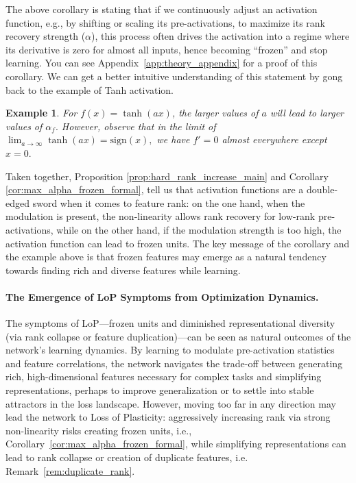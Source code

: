 \documentclass{article}
\newcommand{\GIU}[1]{\todo[color=purple!30,size=\tiny]{GIU: #1}}
\newtheorem{example}{Example}[section] %
\numberwithin{figure}{section}
\begin{document}
The above corollary is stating that if we continuously adjust an activation function, e.g., by shifting or scaling its pre-activations, to maximize its rank recovery strength ($\alpha$), this process often drives the activation into a regime where its derivative is zero for almost all inputs, hence becoming ``frozen'' and stop learning. You can see Appendix~\ref{app:theory_appendix} for a proof of this corollary. We can get a better intuitive understanding of this statement by gong back to the example of Tanh activation.

\begin{example}
For $f(x) = \tanh(ax)$, the larger values of $a$ will lead to larger values of $\alpha_f.$ However, observe that in the limit of $\lim_{a \to \infty} \tanh(a x) = \text{sign}(x),$ we have $f'=0$ almost everywhere except $x=0.$ 
\end{example}

Taken together, Proposition \ref{prop:hard_rank_increase_main} and Corollary \ref{cor:max_alpha_frozen_formal}, tell us that activation functions are a double-edged sword when it comes to feature rank: on the one hand, when the modulation is present, the non-linearity allows rank recovery for low-rank pre-activations, while on the other hand, if the modulation strength  is too high, the activation function can lead to frozen units.   
The key message of the corollary and the example above is  that frozen features may emerge as a natural tendency towards finding rich and diverse features while learning. 

\paragraph{The Emergence of LoP Symptoms from Optimization Dynamics.} The symptoms of LoP---frozen units and diminished representational diversity (via rank collapse or feature duplication)---can be seen as natural outcomes of the network's learning dynamics. By learning to modulate pre-activation statistics and feature correlations, the network navigates the trade-off between generating rich, high-dimensional features necessary for complex tasks and simplifying representations, perhaps to improve generalization or to settle into stable attractors in the loss landscape.  However, moving too far in any direction may lead the network to Loss of Plasticity: aggressively increasing rank via strong non-linearity risks creating frozen units, i.e., Corollary~\ref{cor:max_alpha_frozen_formal}, while simplifying representations can lead to rank collapse or creation of duplicate features, i.e. Remark~\ref{rem:duplicate_rank}.
\end{document}

